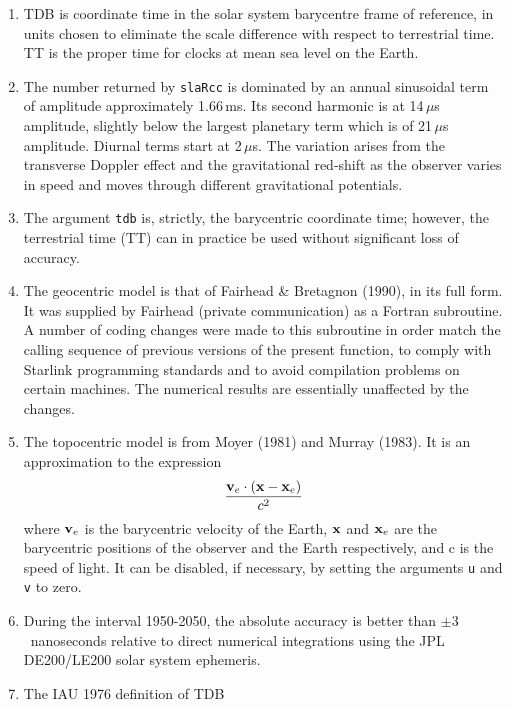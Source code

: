 \documentclass[11pt,fleqn,twoside]{article}
\renewcommand{\_}{{\tt\char'137}}     %
\begin{document}
{
 \begin{enumerate}
  \item TDB is coordinate time in the solar system barycentre frame
        of reference, in units chosen to eliminate the scale difference
        with respect to terrestrial time.  TT is the proper
        time for clocks at mean sea level on the Earth.
  \item The number returned by {\tt slaRcc} is dominated by an
        annual sinusoidal term of amplitude
        approximately 1.66\,ms.  Its second harmonic is at
        14\,$\mu$s amplitude, slightly below the largest
        planetary term which is of 21\,$\mu$s amplitude.
        Diurnal terms start at 2\,$\mu$s.  The
        variation arises from the transverse Doppler effect and the
        gravitational red-shift as the observer varies in speed and
        moves through different gravitational potentials.
  \item The argument {\tt tdb}
        is, strictly, the barycentric coordinate time;
        however, the terrestrial time (TT) can in practice be used without
        significant loss of accuracy.
  \item The geocentric model is that of Fairhead \& Bretagnon (1990), in
        its full form.  It was supplied by Fairhead (private communication)
        as a Fortran subroutine.  A number of coding changes were made to
        this subroutine in order
        match the calling sequence of previous versions of the present
        function, to comply with Starlink programming standards and to
        avoid compilation problems on certain machines.  The
        numerical results are essentially unaffected by the
        changes.
  \item The topocentric model is from Moyer (1981) and Murray (1983).
        It is an approximation to the expression
        \[\frac{{\bf v}_e \cdot ( {\bf x} - {\bf x}_e )}{c^2}\]
        where ${\bf v}_e$ is the barycentric velocity of
        the Earth, ${\bf x}$ and ${\bf x}_e$ are the barycentric positions
        of the observer and the Earth respectively, and
        c is the speed of light.
        It can be disabled, if necessary, by setting the arguments
        {\tt u} and {\tt v} to zero.
  \item During the interval 1950-2050, the absolute accuracy
        is better than $\pm3$~nanoseconds
        relative to direct numerical integrations using the JPL DE200/LE200
        solar system ephemeris.
  \item The IAU 1976 definition of TDB

\end{enumerate}}
\end{document}
